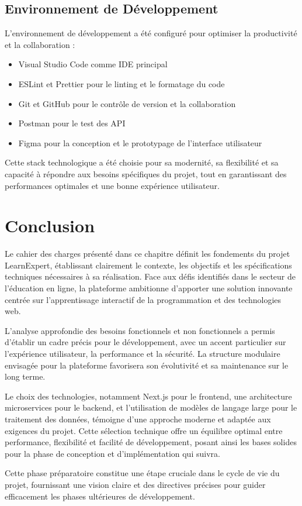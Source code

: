 \subsection{Environnement de Développement}
L'environnement de développement a été configuré pour optimiser la productivité et la collaboration :

\begin{itemize}
  \item Visual Studio Code comme IDE principal
  \item ESLint et Prettier pour le linting et le formatage du code
  \item Git et GitHub pour le contrôle de version et la collaboration
  \item Postman pour le test des API
  \item Figma pour la conception et le prototypage de l'interface utilisateur
\end{itemize}

Cette stack technologique a été choisie pour sa modernité, sa flexibilité et sa capacité à répondre aux besoins spécifiques du projet, tout en garantissant des performances optimales et une bonne expérience utilisateur. 

\section{Conclusion}

Le cahier des charges présenté dans ce chapitre définit les fondements du projet LearnExpert, établissant clairement le contexte, les objectifs et les spécifications techniques nécessaires à sa réalisation. Face aux défis identifiés dans le secteur de l'éducation en ligne, la plateforme ambitionne d'apporter une solution innovante centrée sur l'apprentissage interactif de la programmation et des technologies web.

L'analyse approfondie des besoins fonctionnels et non fonctionnels a permis d'établir un cadre précis pour le développement, avec un accent particulier sur l'expérience utilisateur, la performance et la sécurité. La structure modulaire envisagée pour la plateforme favorisera son évolutivité et sa maintenance sur le long terme.

Le choix des technologies, notamment Next.js pour le frontend, une architecture microservices pour le backend, et l'utilisation de modèles de langage large pour le traitement des données, témoigne d'une approche moderne et adaptée aux exigences du projet. Cette sélection technique offre un équilibre optimal entre performance, flexibilité et facilité de développement, posant ainsi les bases solides pour la phase de conception et d'implémentation qui suivra.

Cette phase préparatoire constitue une étape cruciale dans le cycle de vie du projet, fournissant une vision claire et des directives précises pour guider efficacement les phases ultérieures de développement. 